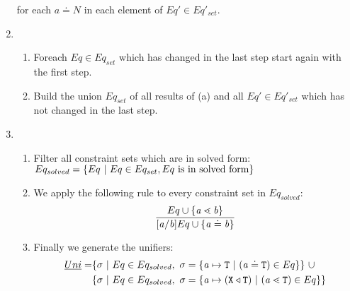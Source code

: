 \begin{enumerate}
      for each $a \doteq N$ in each element of $Eq' \in Eq'_{set}$.

\item 
    \begin{enumerate}
    \item Foreach $Eq \in Eq_{set}$ which has changed in the last step
      start again with the first step.
    \item Build the union $Eq_{set}$ of all results of (a) and all $Eq' \in
      Eq'_{set}$ which has not changed in the last step.
    \end{enumerate}
\item
\begin{enumerate}
  \item Filter all constraint sets which are in solved
  form:\\
$Eq_{solved} = \{  Eq \ | \ Eq \in Eq_{set}, Eq \ \text{is in solved form} \}$
\item We apply the following rule to every constraint set in $Eq_{solved}$:
\begin{align*}
\ddfrac{
  Eq \cup \set{ \tv{a} \lessdot \tv{b} } %
}{
  [\tv{a}/\tv{b}]Eq \cup \set{ \tv{a} \doteq \tv{b} }
}
\end{align*}
\item Finally we generate the unifiers:
\begin{align*}
    \emph{Uni} = &
   \{ \sigma \ | \ Eq \in Eq_{solved},\ \sigma = \{ \mathit{ a } \mapsto \texttt{T} \ | \ (\mathit{ a } \doteq \texttt{T}) \in Eq \}  \} \ \cup \\
   & \{ \sigma \ | \ Eq \in Eq_{solved},\ \sigma = \{ \mathit{ a } \mapsto (\texttt{X} \triangleleft \texttt{T}) \ | \ (\mathit{ a } \lessdot \texttt{T}) \in Eq \}  \}
\end{align*}
\end{enumerate}
\end{enumerate}

